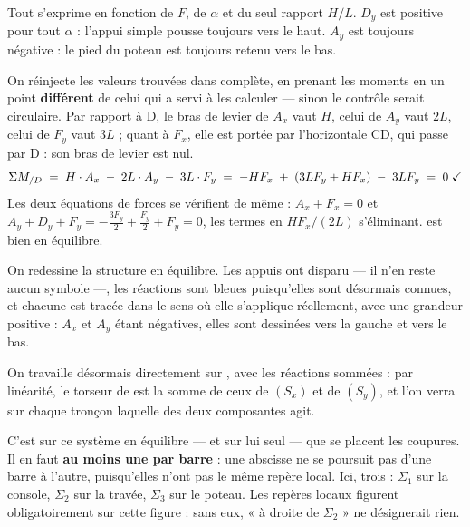 Tout s'exprime en fonction de $F$, de $\alpha$ et du seul rapport $H/L$. $D_y$ est positive pour tout $\alpha$ : l'appui simple pousse toujours vers le haut. $A_y$ est toujours négative : le pied du poteau est toujours retenu vers le bas.


On réinjecte les valeurs trouvées dans \Sq{} complète, en prenant les moments en un point \textbf{différent} de celui qui a servi à les calculer — sinon le contrôle serait circulaire. Par rapport à D, le bras de levier de $A_x$ vaut $H$, celui de $A_y$ vaut $2L$, celui de $F_y$ vaut $3L$ ; quant à $F_x$, elle est portée par l'horizontale CD, qui passe par D : son bras de levier est nul.
\[ \Sigma M_{/D} \;=\; H\cdot A_x \;-\; 2L\cdot A_y \;-\; 3L\cdot F_y \;=\; -HF_x \;+\; \left(3LF_y + HF_x\right) \;-\; 3LF_y \;=\; 0 \;\checkmark \]
Les deux équations de forces se vérifient de même : $A_x + F_x = 0$ et $A_y + D_y + F_y = -\frac{3F_y}{2} + \frac{F_y}{2} + F_y = 0$, les termes en $HF_x/(2L)$ s'éliminant. \Sq{} est bien en équilibre.


On redessine la structure en équilibre. Les appuis ont disparu — il n'en reste aucun symbole —, les réactions sont bleues puisqu'elles sont désormais connues, et chacune est tracée dans le sens où elle s'applique réellement, avec une grandeur positive : $A_x$ et $A_y$ étant négatives, elles sont dessinées vers la gauche et vers le bas.

On travaille désormais directement sur \Sq{}, avec les réactions sommées : par linéarité, le torseur de \Sq{} est la somme de ceux de $(S_x)$ et de $(S_y)$, et l'on verra sur chaque tronçon laquelle des deux composantes agit.

C'est sur ce système en équilibre — et sur lui seul — que se placent les coupures. Il en faut \textbf{au moins une par barre} : une abscisse ne se poursuit pas d'une barre à l'autre, puisqu'elles n'ont pas le même repère local. Ici, trois : $\Sigma_1$ sur la console, $\Sigma_2$ sur la travée, $\Sigma_3$ sur le poteau. Les repères locaux figurent obligatoirement sur cette figure : sans eux, « à droite de $\Sigma_2$ » ne désignerait rien.

